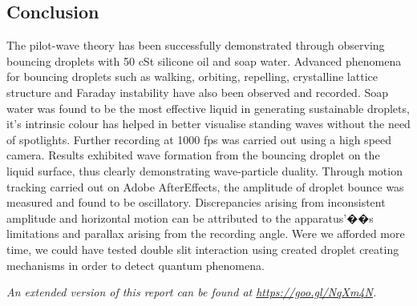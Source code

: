 \subsection{Conclusion}
The pilot-wave theory has been successfully demonstrated through observing bouncing droplets with 50 cSt silicone oil and soap water. Advanced phenomena for bouncing droplets such as walking, orbiting, repelling, crystalline lattice structure and Faraday instability have also been observed and recorded. Soap water was found to be the most effective liquid in generating sustainable droplets, it's intrinsic colour has helped in better visualise standing waves without the need of spotlights. Further recording at 1000 fps was carried out using a high speed camera. Results exhibited wave formation from the bouncing droplet on the liquid surface, thus clearly demonstrating wave-particle duality. Through motion tracking carried out on Adobe AfterEffects, the amplitude of droplet bounce was measured and found to be oscillatory. Discrepancies arising from inconsistent amplitude and horizontal motion can be attributed to the apparatus'��s limitations and parallax arising from the recording angle. Were we afforded more time, we could have tested double slit interaction using created droplet creating mechanisms in order to detect quantum phenomena.

\textit{An extended version of this report can be found at \url{https://goo.gl/NqXm4N}.}